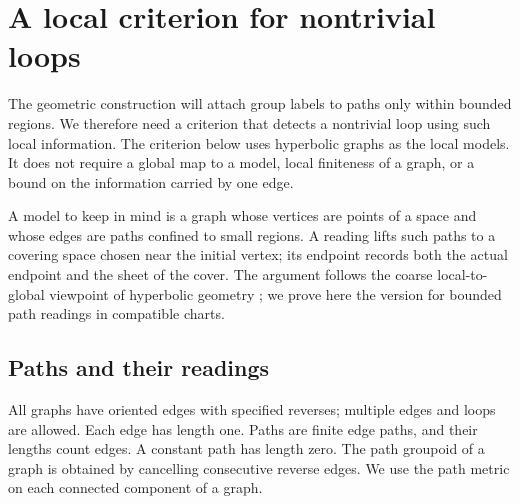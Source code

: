 \section{A local criterion for nontrivial loops}\label{sec:paths}

The geometric construction will attach group labels to paths only within
bounded regions.  We therefore need a criterion that detects a nontrivial
loop using such local information.  The criterion below uses hyperbolic
graphs as the local models.  It does not require a global map to a model,
local finiteness of a graph, or a bound on the information carried by one
edge.

A model to keep in mind is a graph whose vertices are points of a space
and whose edges are paths confined to small regions.  A reading lifts
such paths to a covering space chosen near the initial vertex; its
endpoint records both the actual endpoint and the sheet of the cover.
The argument follows the coarse local-to-global viewpoint of hyperbolic
geometry \cite{Gromov1987}; we prove here the version for bounded path
readings in compatible charts.

\subsection{Paths and their readings}

All graphs have oriented edges with specified reverses; multiple edges and
loops are allowed.  Each edge has length one.  Paths are finite edge paths,
and their lengths count edges.  A constant path has length zero.  The path
groupoid of a graph is obtained by cancelling consecutive reverse edges.
We use the path metric on each connected component of a graph.

